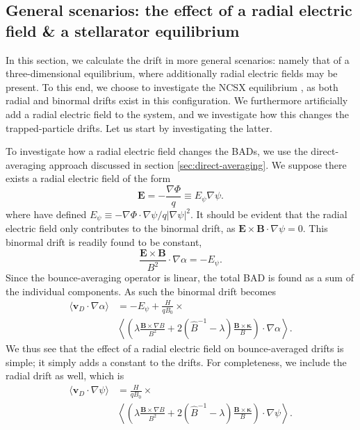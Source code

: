 \subsection{General scenarios: the effect of a radial electric field \& a stellarator equilibrium}
In this section, we calculate the drift in more general scenarios: namely that of a three-dimensional equilibrium, where additionally radial electric fields may be present. To this end, we choose to investigate the NCSX equilibrium \cite{zarnstorff2001physics}, as both radial and binormal drifts exist in this configuration. We furthermore artificially add a radial electric field to the system, and we investigate how this changes the trapped-particle drifts. Let us start by investigating the latter. \par 
To investigate how a radial electric field changes the BADs, we use the direct-averaging approach discussed in section \ref{sec:direct-averaging}. We suppose there exists a radial electric field of the form
\begin{equation}
    \mathbf{E} = - \frac{\nabla \Phi}{q} \equiv E_\psi \nabla \psi .
\end{equation}
where have defined $E_\psi \equiv - \nabla \Phi \cdot \nabla \psi / q |\nabla \psi|^2$. It should be evident that the radial electric field only contributes to the binormal drift, as $\mathbf{E} \times \mathbf{B} \cdot \nabla \psi = 0$. This binormal drift is readily found to be constant,
\begin{equation}
    \frac{\mathbf{E} \times \mathbf{B}}{B^2} \cdot \nabla \alpha = - E_\psi.
\end{equation}
Since the bounce-averaging operator is linear, the total BAD is found as a sum of the individual components. As such the binormal drift becomes
\begin{equation}
\begin{aligned}
    \langle \mathbf{v}_D \cdot \nabla \alpha \rangle &= - E_\psi + \frac{H}{q B_0} \times \\
    &  \left\langle \left(  \lambda \frac{\mathbf{B} \times \nabla B}{B^2} + 2 (\hat{B}^{-1}-\lambda) \frac{\mathbf{B} \times \boldsymbol{\kappa}}{B} \right) \cdot \nabla \alpha \right\rangle.
\end{aligned}
\end{equation}
We thus see that the effect of a radial electric field on bounce-averaged drifts is simple; it simply adds a constant to the drifts. For completeness, we include the radial drift as well, which is 
\begin{equation}
\begin{aligned}
    \langle \mathbf{v}_D \cdot \nabla \psi \rangle &=  \frac{H}{q B_0} \times \\
    &  \left\langle \left(  \lambda \frac{\mathbf{B} \times \nabla B}{B^2} + 2 (\hat{B}^{-1}-\lambda) \frac{\mathbf{B} \times \boldsymbol{\kappa}}{B} \right) \cdot \nabla \psi \right\rangle.
\end{aligned}
\end{equation}
